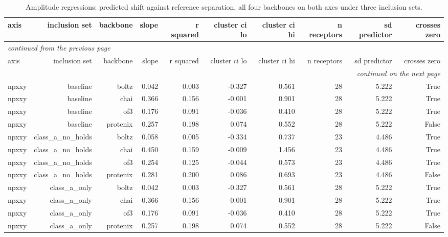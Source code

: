 \begingroup\footnotesize\setlength{\tabcolsep}{3pt}
\begin{longtable}{lrrrrrrrrr}
\caption{Amplitude regressions: predicted shift against reference separation, all four backbones on both axes under three inclusion sets.}
\label{tab:t3_amplitude_fits}\\
\toprule
axis & inclusion set & backbone & slope & r squared & cluster ci lo & cluster ci hi & n receptors & sd predictor & crosses zero \\
\midrule
\endfirsthead
\multicolumn{10}{l}{\scriptsize\itshape continued from the previous page}\\
\toprule
axis & inclusion set & backbone & slope & r squared & cluster ci lo & cluster ci hi & n receptors & sd predictor & crosses zero \\
\midrule
\endhead
\midrule
\multicolumn{10}{r}{\scriptsize\itshape continued on the next page}\\
\endfoot
\bottomrule
\endlastfoot
npxxy & baseline & boltz & 0.042 & 0.003 & -0.327 & 0.561 & 28 & 5.222 & True \\
npxxy & baseline & chai & 0.366 & 0.156 & -0.001 & 0.901 & 28 & 5.222 & True \\
npxxy & baseline & of3 & 0.176 & 0.091 & -0.036 & 0.410 & 28 & 5.222 & True \\
npxxy & baseline & protenix & 0.257 & 0.198 & 0.074 & 0.552 & 28 & 5.222 & False \\
npxxy & class\_a\_no\_holds & boltz & 0.058 & 0.005 & -0.334 & 0.737 & 23 & 4.486 & True \\
npxxy & class\_a\_no\_holds & chai & 0.450 & 0.159 & -0.009 & 1.456 & 23 & 4.486 & True \\
npxxy & class\_a\_no\_holds & of3 & 0.254 & 0.125 & -0.044 & 0.573 & 23 & 4.486 & True \\
npxxy & class\_a\_no\_holds & protenix & 0.281 & 0.200 & 0.086 & 0.693 & 23 & 4.486 & False \\
npxxy & class\_a\_only & boltz & 0.042 & 0.003 & -0.327 & 0.561 & 28 & 5.222 & True \\
npxxy & class\_a\_only & chai & 0.366 & 0.156 & -0.001 & 0.901 & 28 & 5.222 & True \\
npxxy & class\_a\_only & of3 & 0.176 & 0.091 & -0.036 & 0.410 & 28 & 5.222 & True \\
npxxy & class\_a\_only & protenix & 0.257 & 0.198 & 0.074 & 0.552 & 28 & 5.222 & False \\

\end{longtable}
